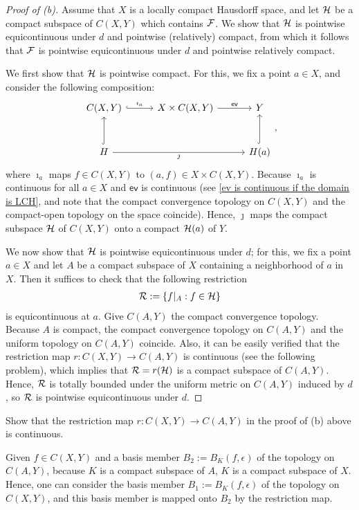 \begin{proof}[Proof of (b)]
    Assume that $X$ is a locally compact Hausdorff space, and let ${\mathcal{H}}$ be a compact subspace of $C(X, Y)$ which contains ${\mathcal{F}}$.
    We show that ${\mathcal{H}}$ is pointwise equicontinuous under $d$ and pointwise (relatively) compact, from which it follows that ${\mathcal{F}}$ is pointwise equicontinuous under $d$ and pointwise relatively compact.

    We first show that ${\mathcal{H}}$ is pointwise compact.
    For this, we fix a point $a\in X$, and consider the following composition:
    \begin{equation*}
    \begin{tikzcd}[row sep=1.0cm, column sep=1.0cm]
        C(X, Y)\arrow[r, "\imath_a", hook]
        &
        X\times C(X, Y)\arrow[r, "\textsf{ev}"]
        &
        Y
        \\
        H\arrow[rr, "\jmath"']\arrow[u, hook]
        &
        &
        H(a)\arrow[u, hook]
    \end{tikzcd},
    \end{equation*}
    where $\imath_a$ maps $f\in C(X, Y)$ to $(a, f)\in X\times C(X, Y)$.
    Because $\imath_a$ is continuous for all $a\in X$ and $\textsf{ev}$ is continuous (see \cref{ev is continuous if the domain is LCH}, and note that the compact convergence topology on $C(X, Y)$ and the compact-open topology on the space coincide).
    Hence, $\jmath$ maps the compact subspace ${\mathcal{H}}$ of $C(X, Y)$ onto a compact ${\mathcal{H}}(a)$ of $Y$.

    We now show that ${\mathcal{H}}$ is pointwise equicontinuous under $d$; for this, we fix a point $a\in X$ and let $A$ be a compact subspace of $X$ containing a neighborhood of $a$ in $X$.
    Then it suffices to check that the following restriction
    \begin{align*}
        {\mathcal{R}}:=\{f|_A: f\in{\mathcal{H}}\}
    \end{align*}
    is equicontinuous at $a$.
    Give $C(A, Y)$ the compact convergence topology.
    Because $A$ is compact, the compact convergence topology on $C(A, Y)$ and the uniform topology on $C(A, Y)$ coincide.
    Also, it can be easily verified that the restriction map $r: C(X, Y)\rightarrow C(A, Y)$ is continuous (see the following problem), which implies that ${\mathcal{R}}=r({\mathcal{H}})$ is a compact subspace of $C(A, Y)$.
    Hence, ${\mathcal{R}}$ is totally bounded under the uniform metric on $C(A, Y)$ induced by $d$, so ${\mathcal{R}}$ is pointwise equicontinuous under $d$.
\end{proof}
\begin{prob}
    Show that the restriction map $r: C(X, Y)\rightarrow C(A, Y)$ in the proof of (b) above is continuous.
\end{prob}
\begin{sol}
    Given $f\in C(X, Y)$ and a basis member $B_2:=B_K(f, \epsilon)$ of the topology on $C(A, Y)$, because $K$ is a compact subspace of $A$, $K$ is a compact subspace of $X$.
    Hence, one can consider the basis member $B_1:=B_K(f, \epsilon)$ of the topology on $C(X, Y)$, and this basis member is mapped onto $B_2$ by the restriction map.
\end{sol}

